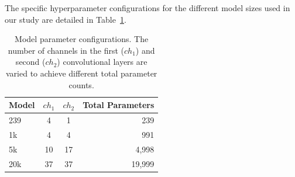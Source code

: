 The specific hyperparameter configurations for the different model sizes used in our study are detailed in Table~\ref{tab:model-params}.

\begin{table}[htbp]
\centering
\caption{Model parameter configurations. The number of channels in the first ($ch_1$) and second ($ch_2$) convolutional layers are varied to achieve different total parameter counts.}
\label{tab:model-params}
\begin{tabular}{l c c r}
\toprule
\textbf{Model} & \textbf{$ch_1$} & \textbf{$ch_2$} & \textbf{Total Parameters} \\
\midrule
239    & 4  & 1  & 239 \\
1k    & 4  & 4  & 991 \\
5k  & 10 & 17  & 4,998 \\
20k   & 37 & 37 & 19,999 \\
\bottomrule
\end{tabular}
\end{table}


